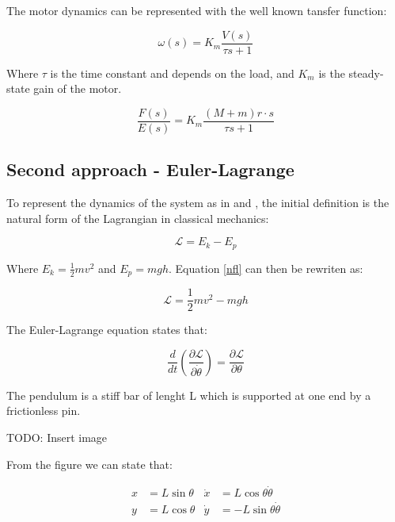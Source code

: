 \documentclass{article}
\begin{document}
The motor dynamics can be represented with the well known tansfer function:

\begin{equation} \label{md}
	\omega(s)=K_m\frac{V(s)}{\tau s+1}
\end{equation}

Where $\tau$ is the time constant and depends on the load, and $K_m$ is the steady-state gain of the motor.

\begin{equation} \label{mtf}
	\frac{F(s)}{E(s)}=K_m\frac{(M+m)r\cdot s}{\tau s+1}
\end{equation}

\subsection{Second approach - Euler-Lagrange}

To represent the dynamics of the system as in \cite{JER12} and \cite{LUN02}, the initial definition is the natural form of the Lagrangian in classical mechanics:

\begin{equation} \label{nfl}
	\mathcal{L}=E_k-E_p
\end{equation}

Where $E_k=\frac{1}{2}mv^2$ and $E_p=mgh$. Equation \ref{nfl} can then be rewriten as:

\begin{equation} \label{nflr}
	\mathcal{L}=\frac{1}{2}mv^2-mgh
\end{equation}

The Euler-Lagrange equation states that:

\begin{equation} \label{ele}
	\frac{d}{dt}\left( \frac{\partial\mathcal{L}}{\partial\dot{\theta}} \right)=\frac{\partial\mathcal{L}}{\partial\theta}
\end{equation}

The pendulum is a stiff bar of lenght L which is supported at one end by a frictionless pin.

TODO: Insert image

From the figure we can state that:

\begin{equation} \label{coord}
	\begin{aligned}
		x&=L\sin{\theta} & \dot{x}&=L\cos{\theta}\dot{\theta}\\
		y&=L\cos{\theta} & \dot{y}&=-L\sin{\theta}\dot{\theta}
	\end{aligned}
\end{equation}
\end{document}
